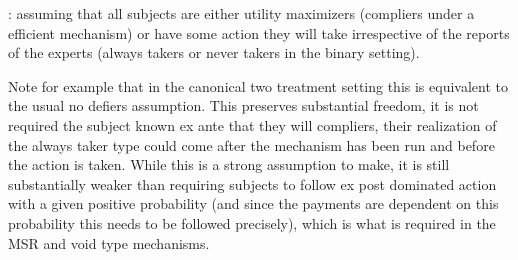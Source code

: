 \begin{defn}: assuming that all subjects are either utility maximizers (compliers under a efficient mechanism) or have some action they will take irrespective of the reports of the experts (always takers or never takers in the binary setting). 
\end{defn}

Note for example that in the canonical two treatment setting this is equivalent to the usual no defiers assumption.
This preserves substantial freedom, it is not required the subject known ex ante that they will compliers, their realization of the always taker type could come after the mechanism has been run and before the action is taken. 
While this is a strong assumption to make, it is still substantially weaker than requiring subjects to follow ex post dominated action with a given positive probability (and since the payments are dependent on this probability this needs to be followed precisely), which is what is required in the MSR and void type mechanisms.







